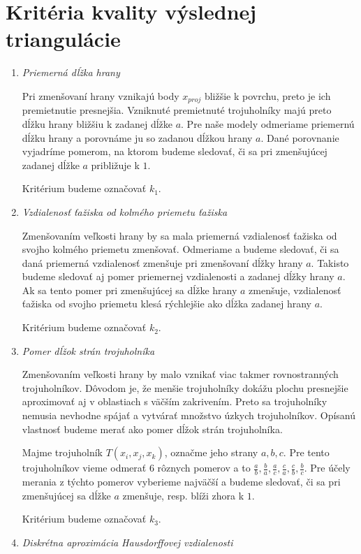 \section{Kritéria kvality výslednej triangulácie}
\begin{enumerate}
\item{
    \textit{Priemerná dĺžka hrany}

    Pri zmenšovaní hrany vznikajú body $x_{proj}$ bližšie k povrchu, preto je ich premietnutie
    presnejšia. Vzniknuté premietnuté trojuholníky majú preto dĺžku hrany bližšiu k zadanej dĺžke 
    $a$. Pre naše modely odmeriame priemernú dĺžku hrany a porovnáme ju so zadanou dĺžkou hrany $a$. 
    Dané porovnanie vyjadríme 
    pomerom, na ktorom budeme sledovať, či sa pri zmenšujúcej zadanej dĺžke $a$ približuje k $1$.

    Kritérium budeme označovať $k_1$.
}
\item{
    \textit{Vzdialenosť ťažiska od kolmého priemetu ťažiska}

    Zmenšovaním veľkosti hrany by sa mala priemerná vzdialenosť ťažiska od svojho kolmého 
    priemetu zmenšovať. Odmeriame a budeme sledovať, či sa daná priemerná vzdialenosť
    zmenšuje pri zmenšovaní dĺžky hrany $a$. Takisto budeme sledovať aj pomer priemernej 
    vzdialenosti a zadanej dĺžky hrany $a$. Ak sa tento pomer pri zmenšujúcej sa dĺžke hrany 
    $a$ zmenšuje, vzdialenosť 
    ťažiska od svojho priemetu klesá rýchlejšie ako dĺžka zadanej hrany $a$.

    Kritérium budeme označovať $k_2$.
}
\item{
    \textit{Pomer dĺžok strán trojuholníka}

    Zmenšovaním veľkosti hrany by malo vznikať viac takmer rovnostranných trojuholníkov.
    Dôvodom je, že menšie trojuholníky dokážu plochu presnejšie aproximovať aj v oblastiach 
    s väčším zakrivením. Preto sa trojuholníky nemusia nevhodne spájať a vytvárať množstvo 
    úzkych trojuholníkov. Opísanú vlastnosť budeme merať ako pomer dĺžok strán trojuholníka. 
    
    Majme trojuholník $T(x_i, x_j, x_k)$, označme jeho strany $a, b, c$. Pre tento trojuholníkov 
    vieme odmerať 6 rôznych pomerov a to 
    $\frac{a}{b}, \frac{b}{a}, \frac{a}{c}, \frac{c}{a}, \frac{c}{b}, \frac{b}{c}$.
    Pre účely merania z týchto pomerov vyberieme najväčší a budeme sledovať, či sa pri 
    zmenšujúcej sa dĺžke $a$ zmenšuje, resp. blíži zhora k $1$.

    Kritérium budeme označovať $k_3$.
}
\item{
    \textit{Diskrétna aproximácia Hausdorffovej vzdialenosti}

}
\end{enumerate}
